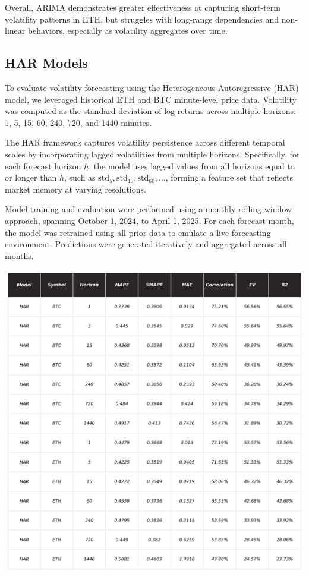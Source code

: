 \documentclass[9pt]{article}
\begin{document}
\begin{multicols}{2}
		Overall, ARIMA demonstrates greater effectiveness at capturing short-term volatility patterns in ETH, but struggles with long-range dependencies and non-linear behaviors, especially as volatility aggregates over time.
		
		\subsection{HAR Models}
		
		To evaluate volatility forecasting using the Heterogeneous Autoregressive (HAR) model, we leveraged historical ETH and BTC minute-level price data. Volatility was computed as the standard deviation of log returns across multiple horizons: 1, 5, 15, 60, 240, 720, and 1440 minutes.
		
		\smallskip
		
		The HAR framework captures volatility persistence across different temporal scales by incorporating lagged volatilities from multiple horizons. Specifically, for each forecast horizon \( h \), the model uses lagged values from all horizons equal to or longer than \( h \), such as \( \text{std}_{5}, \text{std}_{15}, \text{std}_{60}, \ldots \), forming a feature set that reflects market memory at varying resolutions.
		
		Model training and evaluation were performed using a monthly rolling-window approach, spanning October 1, 2024, to April 1, 2025. For each forecast month, the model was retrained using all prior data to emulate a live forecasting environment. Predictions were generated iteratively and aggregated across all months.
		
		\centering
		\includegraphics[width=.99\columnwidth]{img/_KPI_HAR.png}
		\label{fig:_KPI_HAR}
		\justifying
		\medskip
		

\end{multicols}
\end{document}
